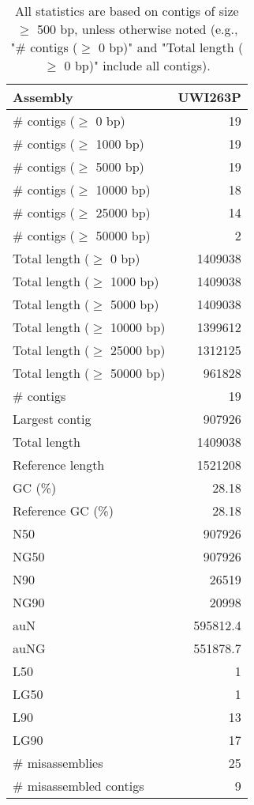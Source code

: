 \documentclass[12pt,a4paper]{article}
\begin{document}
\begin{table}[ht]
\begin{center}
\caption{All statistics are based on contigs of size $\geq$ 500 bp, unless otherwise noted (e.g., "\# contigs ($\geq$ 0 bp)" and "Total length ($\geq$ 0 bp)" include all contigs).}
\begin{tabular}{|l*{1}{|r}|}
\hline
Assembly & UWI263P \\ \hline
\# contigs ($\geq$ 0 bp) & 19 \\ \hline
\# contigs ($\geq$ 1000 bp) & 19 \\ \hline
\# contigs ($\geq$ 5000 bp) & 19 \\ \hline
\# contigs ($\geq$ 10000 bp) & 18 \\ \hline
\# contigs ($\geq$ 25000 bp) & 14 \\ \hline
\# contigs ($\geq$ 50000 bp) & 2 \\ \hline
Total length ($\geq$ 0 bp) & 1409038 \\ \hline
Total length ($\geq$ 1000 bp) & 1409038 \\ \hline
Total length ($\geq$ 5000 bp) & 1409038 \\ \hline
Total length ($\geq$ 10000 bp) & 1399612 \\ \hline
Total length ($\geq$ 25000 bp) & 1312125 \\ \hline
Total length ($\geq$ 50000 bp) & 961828 \\ \hline
\# contigs & 19 \\ \hline
Largest contig & 907926 \\ \hline
Total length & 1409038 \\ \hline
Reference length & 1521208 \\ \hline
GC (\%) & 28.18 \\ \hline
Reference GC (\%) & 28.18 \\ \hline
N50 & 907926 \\ \hline
NG50 & 907926 \\ \hline
N90 & 26519 \\ \hline
NG90 & 20998 \\ \hline
auN & 595812.4 \\ \hline
auNG & 551878.7 \\ \hline
L50 & 1 \\ \hline
LG50 & 1 \\ \hline
L90 & 13 \\ \hline
LG90 & 17 \\ \hline
\# misassemblies & 25 \\ \hline
\# misassembled contigs & 9 \\ \hline

\end{tabular}
\end{center}
\end{table}
\end{document}
